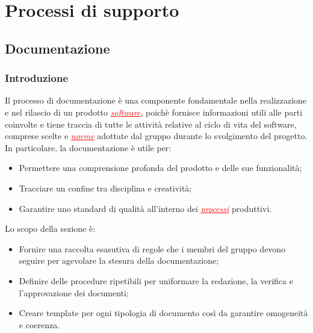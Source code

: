 \section{Processi di supporto}


\subsection{Documentazione}

\subsubsection{Introduzione}
Il processo di documentazione è una componente fondamentale nella realizzazione e nel rilascio di un prodotto \textcolor{red}{\uline{\textit{software}}},
poichè fornisce informazioni utili alle parti coinvolte e tiene traccia di tutte le attività relative al ciclo di vita del software,
comprese scelte e \textcolor{red}{\uline{\textit{norme}}} adottate dal gruppo durante lo svolgimento del progetto. In particolare, la documentazione è utile per:
\begin{itemize}
    \item Permettere una comprensione profonda del prodotto e delle sue funzionalità;
    \item Tracciare un confine tra disciplina e creatività;
    \item Garantire uno standard di qualità all'interno dei \textcolor{red}{\uline{\textit{processi}}} produttivi.
\end{itemize} 
Lo scopo della sezione è:
\begin{itemize}
    \item Fornire una raccolta esasutiva di regole che i membri del gruppo devono seguire per agevolare la stesura della documentazione;
    \item Definire delle procedure ripetibili per uniformare la redazione, la verifica e l'approvazione dei documenti;
    \item Creare template per ogni tipologia di documento così da garantire omogeneità e coerenza.
\end{itemize}

